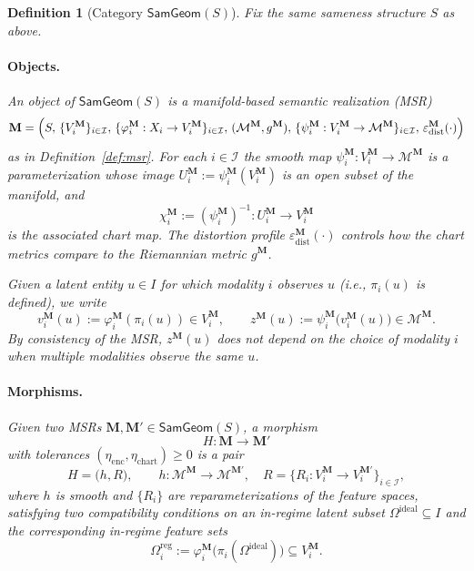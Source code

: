 \documentclass[11pt]{article}
\newtheorem{definition}{Definition}
\newcommand{\SamGeom}{\mathsf{SamGeom}}
\begin{document}
\begin{definition}[Category $\SamGeom(S)$]
\label{def:samgeom-category}
Fix the same sameness structure $S$ as above.

\paragraph{Objects.}
An object of $\SamGeom(S)$ is a manifold-based semantic realization (MSR)
\[
\mathbf{M}
=
\Bigl(
S,\,
\{V_i^{\mathbf{M}}\}_{i\in\mathcal{I}},\,
\{\varphi_i^{\mathbf{M}} : X_i \to V_i^{\mathbf{M}}\}_{i\in\mathcal{I}},\,
(\mathcal{M}^{\mathbf{M}}, g^{\mathbf{M}}),\,
\{\psi_i^{\mathbf{M}} : V_i^{\mathbf{M}} \to \mathcal{M}^{\mathbf{M}}\}_{i\in\mathcal{I}},\,
\varepsilon_{\mathrm{dist}}^{\mathbf{M}}(\cdot)
\Bigr)
\]
as in Definition~\ref{def:msr}. For each $i \in \mathcal{I}$ the smooth map
$\psi_i^{\mathbf{M}} : V_i^{\mathbf{M}} \to \mathcal{M}^{\mathbf{M}}$ is a parameterization whose image
$U_i^{\mathbf{M}} := \psi_i^{\mathbf{M}}(V_i^{\mathbf{M}})$ is an open subset of the manifold, and
\[
\chi_i^{\mathbf{M}} := (\psi_i^{\mathbf{M}})^{-1} : U_i^{\mathbf{M}} \to V_i^{\mathbf{M}}
\]
is the associated chart map. The distortion profile $\varepsilon_{\mathrm{dist}}^{\mathbf{M}}(\cdot)$ controls
how the chart metrics compare to the Riemannian metric $g^{\mathbf{M}}$.

Given a latent entity $u \in I$ for which modality $i$ observes $u$ (i.e., $\pi_i(u)$ is defined),
we write
\[
v_i^{\mathbf{M}}(u)
:= \varphi_i^{\mathbf{M}}(\pi_i(u)) \in V_i^{\mathbf{M}},
\qquad
z^{\mathbf{M}}(u)
:= \psi_i^{\mathbf{M}}\bigl(v_i^{\mathbf{M}}(u)\bigr) \in \mathcal{M}^{\mathbf{M}}.
\]
By consistency of the MSR, $z^{\mathbf{M}}(u)$ does not depend on the choice of modality $i$ when
multiple modalities observe the same $u$.

\paragraph{Morphisms.}
Given two MSRs $\mathbf{M}, \mathbf{M}' \in \SamGeom(S)$, a morphism
\[
H : \mathbf{M} \to \mathbf{M}'
\]
with tolerances $(\eta_{\mathrm{enc}}, \eta_{\mathrm{chart}}) \ge 0$ is a pair
\[
H = \bigl(h, R\bigr),
\qquad
h : \mathcal{M}^{\mathbf{M}} \to \mathcal{M}^{\mathbf{M}'},
\quad
R = \{R_i : V_i^{\mathbf{M}} \to V_i^{\mathbf{M}'}\}_{i\in\mathcal{I}},
\]
where $h$ is smooth and $\{R_i\}$ are reparameterizations of the feature spaces, satisfying two
compatibility conditions on an in-regime latent subset $\Omega^{\mathrm{ideal}} \subseteq I$ and the
corresponding in-regime feature sets
\[
\Omega^{\mathrm{reg}}_i
:=
\varphi_i^{\mathbf{M}}\bigl(\pi_i(\Omega^{\mathrm{ideal}})\bigr)
\subseteq V_i^{\mathbf{M}}.
\]


\end{definition}
\end{document}
